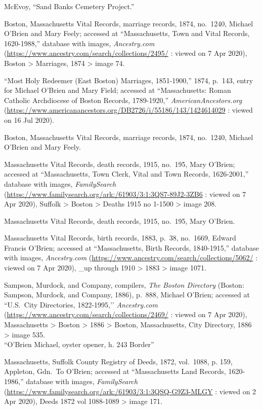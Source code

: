 \begin{thebibliography}{999}
McEvoy, ``Sand Banks Cemetery Project.'' 

Boston, Massachusetts Vital Records, marriage records, 1874, no.\ 1240, Michael O'Brien and Mary Feely; accessed at ``Massachusetts, Town and Vital Records, 1620-1988,'' database with images, \textit{Ancestry.com} (\url{https://www.ancestry.com/search/collections/2495/} : viewed on 7 Apr 2020), Boston > Marriages, 1874 > image 74.

``Most Holy Redeemer (East Boston) Marriages, 1851-1900,'' 1874, p.\ 143, entry for Michael O'Brien and Mary Field; accessed at ``Massachusetts: Roman Catholic Archdiocese of Boston Records, 1789-1920,'' \textit{AmericanAncestors.org} (\url{https://www.americanancestors.org/DB2726/i/55186/143/1424614029} : viewed on 16 Jul 2020).

Boston, Massachusetts Vital Records, marriage records, 1874, no.\ 1240, Michael O'Brien and Mary Feely.

Massachusetts Vital Records, death records, 1915, no.\ 195, Mary O'Brien; accessed at ``Massachusetts, Town Clerk, Vital and Town Records, 1626-2001,'' database with images, \textit{FamilySearch} (\url{https://www.familysearch.org/ark:/61903/3:1:3QS7-89J2-3ZB6} : viewed on 7 Apr 2020), Suffolk > Boston > Deaths 1915 no 1-1500 > image 208.

Massachusetts Vital Records, death records, 1915, no.\ 195, Mary O'Brien.

Massachusetts Vital Records, birth records, 1883, p.\ 38, no.\ 1669, Edward Francis O'Brien; accessed at ``Massachusetts, Birth Records, 1840-1915,'' database with images, \textit{Ancestry.com} (\url{https://www.ancestry.com/search/collections/5062/} : viewed on 7 Apr 2020), \_up through 1910 > 1883 > image 1071.

Sampson, Murdock, and Company, compilers, \textit{The Boston Directory} (Boston: Sampson, Murdock, and Company, 1886), p.\ 888, Michael O'Brien; accessed at ``U.S.\ City Directories, 1822-1995,’’ \textit{Ancestry.com} (\url{https://www.ancestry.com/search/collections/2469/} : viewed on 7 Apr 2020), Massachusetts > Boston > 1886 > Boston, Massachusetts, City Directory, 1886 > image 535.\\
``O'Brien Michael, oyster opener, h. 243 Border''

Massachusetts, Suffolk County Registry of Deeds, 1872, vol.\ 1088, p. 159, Appleton, Gdn.\ To O’Brien; accessed at ``Massachusetts Land Records, 1620-1986,'' database with images, \textit{FamilySearch} (\url{https://www.familysearch.org/ark:/61903/3:1:3QSQ-G9Z3-MLGY} : viewed on 2 Apr 2020), Deeds 1872 vol 1088-1089 > image 171.


\end{thebibliography}
